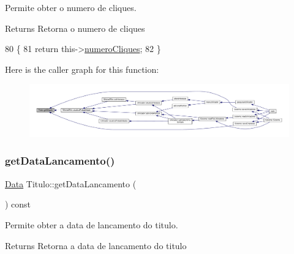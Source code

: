 Permite obter o numero de cliques. 

\begin{DoxyReturn}{Returns}
Retorna o numero de cliques 
\end{DoxyReturn}

\begin{DoxyCode}
80                                        \{
81      \textcolor{keywordflow}{return} this->\hyperlink{classTitulo_a7775da325c14a4d76f2d3b0800c28fa3}{numeroCliques};
82  \}
\end{DoxyCode}
Here is the caller graph for this function\+:
\nopagebreak
\begin{figure}[H]
\begin{center}
\leavevmode
\includegraphics[width=350pt]{classTitulo_a71d5b5985170de5612ec49c5c955f120_icgraph}
\end{center}
\end{figure}
\mbox{\label{classTitulo_a1cb9b8c0a9dca73d5925922ccc041fa8}} 
\subsubsection{\texorpdfstring{get\+Data\+Lancamento()}{getDataLancamento()}}
{\footnotesize\ttfamily \hyperlink{classData}{Data} Titulo\+::get\+Data\+Lancamento (\begin{DoxyParamCaption}{ }\end{DoxyParamCaption}) const}



Permite obter a data de lancamento do titulo. 

\begin{DoxyReturn}{Returns}
Retorna a data de lancamento do titulo 
\end{DoxyReturn}

